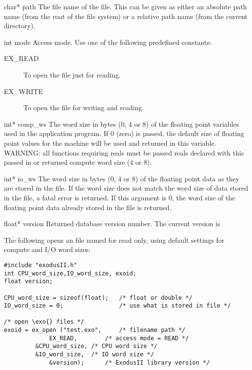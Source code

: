 
\begin{parameters}
\item[{char* path \R{}}]
The file name of the \exo{} file. This can be given as either an
absolute path name (from the root of the file system) or a relative
path name (from the current directory).

\item[{int mode \R{}}]
Access mode. Use one of the following predefined constants:

\begin{description}
 \item [EX_READ] To open the file just for reading.

 \item [EX_WRITE] To open the file for writing and reading.
\end{description}

\item[{int* comp_ws \RW{}}]
The word size in bytes (0, 4 or 8) of the floating point variables
used in the application program. If 0 (zero) is passed, the default
size of floating point values for the machine will be used and
returned in this variable. WARNING: all \exo{} functions requiring
reals must be passed reals declared with this passed in or returned
compute word size (4 or 8).


\item[{int* io_ws \RW{}}]
The word size in bytes (0, 4 or 8) of the floating
point data as they are stored in the \exo{} file. If the word
size does not match the word size of data stored in the file,
a fatal error is returned. If this argument is 0, the word size
of the floating point data already stored in the file is returned.

\item[{float* version \W{}}]
Returned \exo{} database version number. The current version is
\version{}
\end{parameters}

The following opens an \exo{} file named  for read
only, using default settings for compute and I/O word sizes:

\begin{lstlisting}
#include "exodusII.h"
int CPU_word_size,IO_word_size, exoid;
float version;

CPU_word_size = sizeof(float);   /* float or double */
IO_word_size = 0;                /* use what is stored in file */

/* open \exo{} files */
exoid = ex_open ("test.exo",     /* filename path */
	         EX_READ,        /* access mode = READ */
		 &CPU_word_size, /* CPU word size */
		 &IO_word_size,  /* IO word size */
	         &version);      /* ExodusII library version */
\end{lstlisting}


